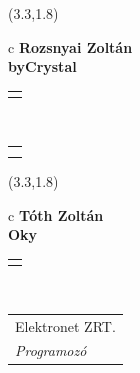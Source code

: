 \documentclass[11pt]{article}
\begin{document}
\makebox(3.3,1.8){
  \renewcommand\arraystretch{1.3}
  \begin{tabular}[c]{c}
    \hspace{8.5mm}
    \LARGE\bf{ Rozsnyai Zoltán }\\
    \hspace{8.5mm}
    \Large{ byCrystal }\\
    \renewcommand\arraystretch{3}
    \begin{tabular}[c]{c}
      \centering
      \fontfamily{phv}\selectfont{
        \textbf{
          \textsc{
            \scriptsize{
            \color{Bright}{ Ismerkedő }\color{Dark}{ Webmester }\color{Bright}{ Sminkmester }\color{Dark}{ Programozó }
            }
          }
        }
      }
    \end{tabular}
    \\
    \renewcommand\arraystretch{1}
    \begin{tabular}{p{3.3in}}
      \hspace{.7cm}\\
      \hspace{.7cm}\emph{  }\\
    \end{tabular}
  \end{tabular}
}

\makebox(3.3,1.8){
  \renewcommand\arraystretch{1.3}
  \begin{tabular}[c]{c}
    \hspace{8.5mm}
    \LARGE\bf{ Tóth Zoltán }\\
    \hspace{8.5mm}
    \Large{ Oky }\\
    \renewcommand\arraystretch{3}
    \begin{tabular}[c]{c}
      \centering
      \fontfamily{phv}\selectfont{
        \textbf{
          \textsc{
            \scriptsize{
            \color{Dark}{ Ismerkedő }\color{Bright}{ Webmester }\color{Bright}{ Sminkmester }\color{Bright}{ Programozó }
            }
          }
        }
      }
    \end{tabular}
    \\
    \renewcommand\arraystretch{1}
    \begin{tabular}{p{3.3in}}
      \hspace{.7cm}Elektronet ZRT.\\
      \hspace{.7cm}\emph{ Programozó }\\
    \end{tabular}
  \end{tabular}
}
\end{document}
